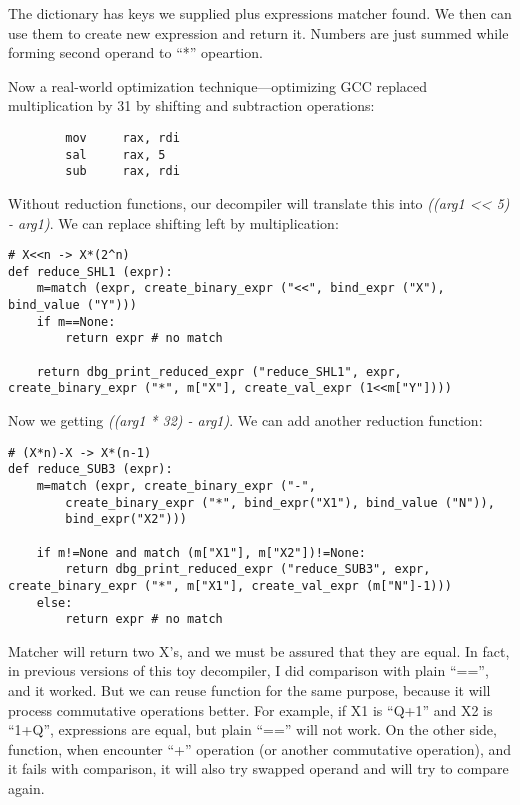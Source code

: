 The dictionary has keys we supplied plus expressions matcher found.
We then can use them to create new expression and return it.
Numbers are just summed while forming second operand to ``*'' opeartion.

Now a real-world optimization technique---optimizing GCC replaced multiplication by 31 by shifting and subtraction operations:

\begin{lstlisting}
        mov     rax, rdi
        sal     rax, 5
        sub     rax, rdi
\end{lstlisting}

Without reduction functions, our decompiler will translate this into \textit{((arg1 << 5) - arg1)}.
We can replace shifting left by multiplication:

\begin{lstlisting}
# X<<n -> X*(2^n)
def reduce_SHL1 (expr):
    m=match (expr, create_binary_expr ("<<", bind_expr ("X"), bind_value ("Y")))
    if m==None:
        return expr # no match
    
    return dbg_print_reduced_expr ("reduce_SHL1", expr, create_binary_expr ("*", m["X"], create_val_expr (1<<m["Y"])))
\end{lstlisting}

Now we getting \textit{((arg1 * 32) - arg1)}.
We can add another reduction function:

\begin{lstlisting}
# (X*n)-X -> X*(n-1)
def reduce_SUB3 (expr):
    m=match (expr, create_binary_expr ("-",
        create_binary_expr ("*", bind_expr("X1"), bind_value ("N")),
        bind_expr("X2")))
    
    if m!=None and match (m["X1"], m["X2"])!=None:
        return dbg_print_reduced_expr ("reduce_SUB3", expr, create_binary_expr ("*", m["X1"], create_val_expr (m["N"]-1)))
    else:
        return expr # no match
\end{lstlisting}

Matcher will return two X's, and we must be assured that they are equal.
In fact, in previous versions of this toy decompiler, I did comparison with plain ``=='', and it worked.
But we can reuse  function for the same purpose, because it will process commutative operations better.
For example, if X1 is ``Q+1'' and X2 is ``1+Q'', expressions are equal, but plain ``=='' will not work.
On the other side,  function, when encounter ``+'' operation (or another commutative operation),
and it fails with comparison, it will also try swapped operand and will try to compare again.

